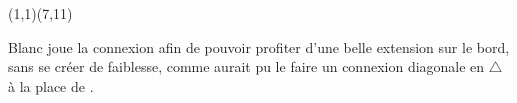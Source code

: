 \documentclass[preview, border=0pt, varwidth=false]{standalone}
\begin{document}
	\setgounit{0.4cm} 
	
\parbox[c][14.65cm][c]{10.2cm}{
	\centering
	

	\begin{psgopartialboard}{(1,1)(7,11)}
		\pass*
		\pass
	\end{psgopartialboard}
	
	\vspace{1em}
	Blanc joue la connexion  afin de pouvoir profiter d'une belle extension sur le bord, sans se créer de faiblesse, comme aurait pu le faire un connexion diagonale en $\triangle$ à la place de .

}
\end{document}
